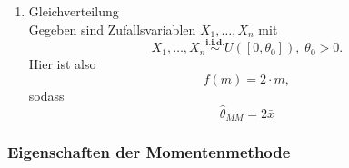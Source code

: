 \documentclass[10pt]{article}
\newcommand{\FZV}{X_1, \ldots, X_n} %
\newenvironment{BSP}[1][]
{\begin{Beispiel}[frametitle=#1]}{\end{Beispiel}}
\begin{document}
\begin{BSP}[Beispiel 1.3.2 (Plug-In-Schätzer)]
\begin{enumerate}[label = (\roman*)]
			sodass
			
			\begin{equation*}
				\left(
				\begin{array}{c}
					\hat{\mu}_{MM}\\
					\hat{\sigma}^2_{MM}\\
				\end{array}
				\right) = 
				f(\bar{x}, \bar{x^2})=
				\left(
				\begin{array}{c}
					\bar{x}\\
					\bar{x^2}-\bar{x}^2\\
				\end{array}
				\right),
			\end{equation*}
			
			
			
			\item Gleichverteilung\\
			Gegeben sind Zufallsvariablen $\FZV$ mit
			\begin{equation*}
				\FZV \overset{\textbf{i.i.d.}}{\sim} U([0,\theta_0]), \; \theta_0 >0.
			\end{equation*}
			Hier ist also
			\begin{equation*}
				f(m) = 2\cdot m,
			\end{equation*}
			sodass
			\begin{equation*}
				\hat{\theta}_{MM} = 2\bar{x}
			\end{equation*}
			
		\end{enumerate}
	\end{BSP}
	
\subsubsection{Eigenschaften der Momentenmethode}
\end{document}
